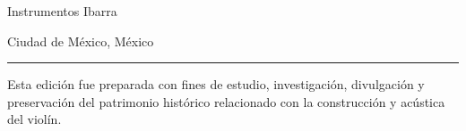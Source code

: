 \begin{center}
Instrumentos Ibarra

\vspace{0.8cm}

Ciudad de México, México\\
\the\year

\vspace{1cm}

\rule{0.6\textwidth}{0.4pt}

\vspace{0.3cm}

\small
Esta edición fue preparada con fines de estudio,
investigación, divulgación y preservación del patrimonio
histórico relacionado con la construcción y acústica del violín.

\end{center}

\vspace*{\fill}